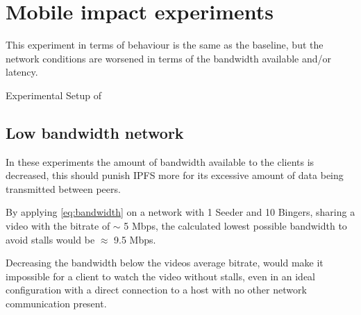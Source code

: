 \if{}

\fi


\FloatBarrier \section{Mobile impact experiments}
\label{sec:eval_mobile}
This experiment in terms of behaviour is the same as the baseline, but the network conditions are worsened  in terms of the bandwidth available and/or latency.

\begin{table}[!htbp]
    \myfloatalign
    \caption[Experimental Setup of Mobile]{Experimental Setup of }
    \label{tab:exp_overview_mobile}
    
\end{table}

\subsection{Low bandwidth network}
\label{sec:eval_low_bandwidth}
In these experiments the amount of bandwidth available to the clients is decreased, this should punish \ac{IPFS} more for its excessive amount of data being transmitted between peers.

By applying \autoref{eq:bandwidth} on a network with 1 Seeder and 10 Bingers, sharing a video with the bitrate of $\sim$ 5 \ac{Mbps}, the calculated lowest possible bandwidth to avoid stalls would be $\approx$ 9.5 \ac{Mbps}.

Decreasing the bandwidth below the videos average bitrate, would make it impossible for a client to watch the video without stalls, even in an ideal configuration with a direct connection to a host with no other network communication present.


